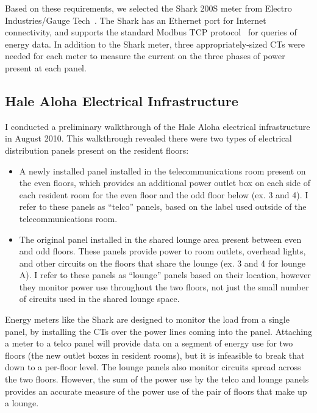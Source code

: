 Based on these requirements, we selected the Shark 200S meter from Electro Industries/Gauge Tech~\cite{shark-200s}. The Shark has an Ethernet port for Internet connectivity, and supports the standard Modbus TCP protocol~\cite{modbus-website} for queries of energy data. In addition to the Shark meter, three appropriately-sized CTs were needed for each meter to measure the current on the three phases of power present at each panel.


\subsection{Hale Aloha Electrical Infrastructure}
\label{sec:electrical-infrastructure}

I conducted a preliminary walkthrough of the Hale Aloha electrical infrastructure in August 2010. This walkthrough revealed there were two types of electrical distribution panels present on the resident floors:

\begin{itemize}
	\item A newly installed panel installed in the telecommunications room present on the even floors, which provides an additional power outlet box on each side of each resident room for the even floor and the odd floor below (ex. 3 and 4). I refer to these panels as ``telco'' panels, based on the label used outside of the telecommunications room.
  \item The original panel installed in the shared lounge area present between even and odd floors. These panels provide power to room outlets, overhead lights, and other circuits on the floors that share the lounge (ex. 3 and 4 for lounge A). I refer to these panels as ``lounge'' panels based on their location, however they monitor power use throughout the two floors, not just the small number of circuits used in the shared lounge space.
\end{itemize}

Energy meters like the Shark are designed to monitor the load from a single panel, by installing the CTs over the power lines coming into the panel. Attaching a meter to a telco panel will provide data on a segment of energy use for two floors (the new outlet boxes in resident rooms), but it is infeasible to break that down to a per-floor level. The lounge panels also monitor circuits spread across the two floors. However, the sum of the power use by the telco and lounge panels provides an accurate measure of the power use of the pair of floors that make up a lounge.


